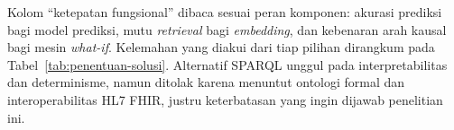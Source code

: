 \begin{table}[htbp]
\vspace{0.4em}
\footnotesize Kolom ``ketepatan fungsional'' dibaca sesuai peran komponen: akurasi prediksi bagi model prediksi, mutu \emph{retrieval} bagi \emph{embedding}, dan kebenaran arah kausal bagi mesin \emph{what-if}. Kelemahan yang diakui dari tiap pilihan dirangkum pada Tabel~\ref{tab:penentuan-solusi}. Alternatif SPARQL unggul pada interpretabilitas dan determinisme, namun ditolak karena menuntut ontologi formal dan interoperabilitas HL7 FHIR, justru keterbatasan yang ingin dijawab penelitian ini.
\end{table}
